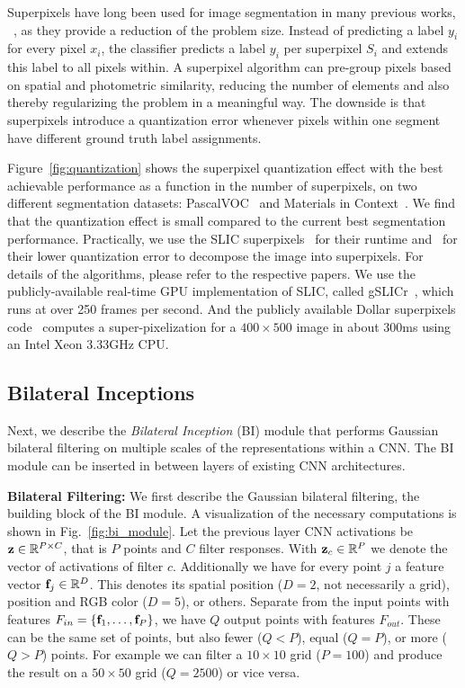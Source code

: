 Superpixels have long been used for image segmentation in many previous
works, \eg~\cite{Gould:ECCV2014,gonfaus2010harmony,nowozin2010parameter,mostajabi2014feedforward},
as they provide a reduction of the problem size.
Instead of predicting a label $y_i$ for every pixel $x_i$, the classifier predicts a label $y_i$
per superpixel $S_i$ and extends this label to all pixels within.
A superpixel algorithm can pre-group pixels based on spatial and photometric similarity,
reducing the number of elements and also thereby regularizing the problem in a
meaningful way. The downside is that superpixels introduce a quantization error whenever
pixels within one segment have different ground truth label assignments.

Figure~\ref{fig:quantization} shows the superpixel quantization effect with
the best achievable performance
as a function in the number of superpixels, on two different segmentation datasets:
PascalVOC~\cite{voc2012segmentation} and Materials in Context~\cite{bell2015minc}.
We find that the quantization effect is small compared to the current best segmentation
performance. Practically, we use the SLIC superpixels~\cite{achanta2012slic} for their runtime and~\cite{DollarICCV13edges} for their lower quantization error to decompose the image into superpixels. For details of the algorithms, please refer to the respective papers. We use the publicly-available
real-time GPU implementation of SLIC, called gSLICr~\cite{gSLICr_2015}, which
runs at over 250 frames per second. And the publicly available Dollar superpixels code~\cite{DollarICCV13edges} computes a super-pixelization for a $400\times 500$ image in about 300ms using an Intel Xeon 3.33GHz CPU.

\subsection{Bilateral Inceptions}\label{sec:inception}

Next, we describe the \emph{Bilateral Inception} (BI) module that performs Gaussian bilateral
filtering on multiple scales of the representations within a CNN.
The BI module can be inserted in between layers of existing CNN architectures.

{\bfseries Bilateral Filtering:} We first describe the Gaussian bilateral filtering,
the building block of the BI module.
A visualization of the necessary computations is shown in Fig.~\ref{fig:bi_module}.
Let the previous layer CNN activations be $\mathbf{z}\in\mathbb{R}^{P\times C}$, that is $P$ points and $C$ filter responses.
With $\mathbf{z}_c\in\mathbb{R}^P$ we denote the vector of activations of filter $c$.
Additionally we have for every point $j$ a feature vector $\mathbf{f}_j\in\mathbb{R}^D$.
This denotes its spatial position ($D=2$, not necessarily a grid), position and RGB color ($D=5$), or others.
Separate from the input points with features $F_{in}=\{\mathbf{f}_1,\ldots,\mathbf{f}_P\}$, we have $Q$ output points with features $F_{out}$.
These can be the same set of points, but also fewer ($Q<P$), equal ($Q=P$), or more ($Q>P$) points.
For example we can filter a $10\times 10$ grid ($P=100$) and produce the result on a $50\times 50$ grid ($Q=2500$) or vice versa.

